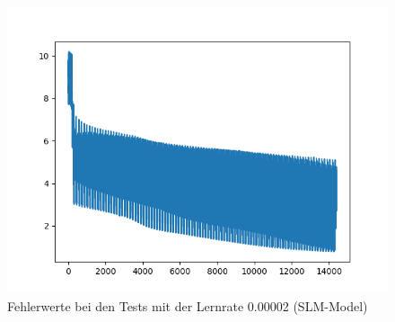 	
	\begin{figure}[H]{\textwidth}
		\centering
		\includegraphics[scale=0.55]{images/slm_101EP.png}
		\caption{Fehlerwerte bei den Tests mit der Lernrate 0.00002 (SLM-Model)}
		\label{NMT_lr2e-5}
	\end{figure}
